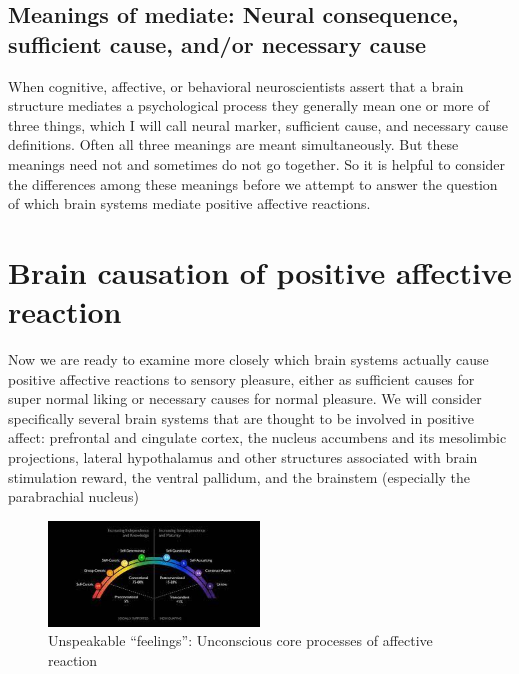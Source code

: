 \documentclass[conference]{IEEEtran}
\begin{document}
\subsection{Meanings of mediate: Neural consequence, sufficient cause, and/or necessary cause }

When cognitive, affective, or behavioral neuroscientists assert that a brain structure mediates a psychological process they generally mean one or more of three
things, which I will call neural marker, sufficient cause,
and necessary cause definitions. Often all three meanings
are meant simultaneously. But these meanings need not
and sometimes do not go together. So it is helpful to
consider the differences among these meanings before we
attempt to answer the question of which brain systems
mediate positive affective reactions.



\section{Brain causation of positive affective reaction}
Now we are ready to examine more closely which
brain systems actually cause positive affective reactions
to sensory pleasure, either as sufficient causes for super 
normal liking or necessary causes for normal pleasure.
We will consider specifically several brain systems that
are thought to be involved in positive affect: prefrontal
and cingulate cortex, the nucleus accumbens and its
mesolimbic projections, lateral hypothalamus and other
structures associated with brain stimulation reward, the
ventral pallidum, and the brainstem (especially the
parabrachial nucleus)

\begin{figure}[h]
  \centering
  \includegraphics[width=0.5\textwidth]{pic-2.jpeg}
  \caption{Unspeakable “feelings”: Unconscious core processes of
affective reaction}
  \label{fig:example}
\end{figure}
\end{document}
